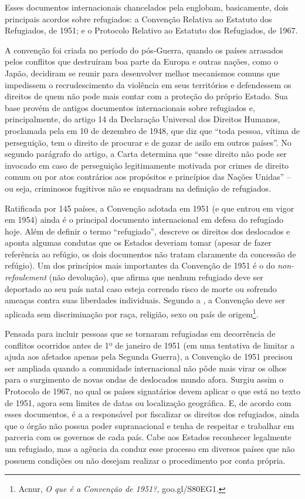 Esses documentos internacionais chancelados pela  englobam,
basicamente, dois principais acordos sobre refugiados: a Convenção
Relativa ao Estatuto dos Refugiados, de 1951; e o Protocolo Relativo ao
Estatuto dos Refugiados, de 1967.

A convenção foi criada no período do pós-Guerra, quando os países
arrasados pelos conflitos que destruíram boa parte da Europa e outras
nações, como o Japão, decidiram se reunir para desenvolver melhor mecanismos
comuns que impedissem o recrudescimento da violência em seus territórios
e defendessem os direitos de quem não pode mais contar com a proteção do
próprio Estado. Sua base provém de antigos documentos internacionais
sobre refugiados e, principalmente, do artigo 14 da Declaração Universal
dos Direitos Humanos, proclamada pela  em 10 de dezembro de 1948, que
diz que ``toda pessoa, vítima de perseguição, tem o direito de procurar
e de gozar de asilo em outros países''. No segundo parágrafo do artigo,
a Carta determina que ``esse direito não pode ser invocado em caso de
perseguição legitimamente motivada por crimes de direito comum ou por
atos contrários aos propósitos e princípios das Nações Unidas'' -- ou
seja, criminosos fugitivos não se enquadram na definição de refugiados.

Ratificada por 145 países, a Convenção adotada em 1951 (e que entrou em
vigor em 1954) ainda é o principal documento internacional em defesa do
refugiado hoje. Além de definir o termo ``refugiado'', descreve os
direitos dos deslocados e aponta algumas condutas que os Estados
deveriam tomar (apesar de fazer referência ao refúgio, os dois
documentos não tratam claramente da concessão de refúgio). Um dos
princípios mais importantes da Convenção de 1951 é o do
\emph{non-refoulement} (não devolução), que afirma que nenhum refugiado
deve ser deportado ao seu país natal caso esteja correndo risco de morte
ou sofrendo ameaças contra suas liberdades individuais. Segundo a ,
a Convenção deve ser aplicada sem discriminação por raça, religião, sexo
ou país de origem\footnote{Acnur, \emph{O que é a
  Convenção de 1951?,}
  goo.gl/S80EG1.}.



Pensada para incluir pessoas que se tornaram refugiadas em decorrência
de conflitos ocorridos antes de 1º de janeiro de 1951 (em uma tentativa
de limitar a ajuda aos afetados apenas pela Segunda Guerra), a Convenção
de 1951 precisou ser ampliada quando a comunidade internacional não pôde
mais virar os olhos para o surgimento de novas ondas de deslocados mundo
afora. Surgiu assim o Protocolo de 1967, no qual os países signatários
devem aplicar o que está no texto de 1951, agora sem limites de datas ou
localização geográfica. E, de acordo com esses documentos, é a  a
responsável por fiscalizar os direitos dos refugiados, ainda que o órgão
não possua poder supranacional e tenha de respeitar e trabalhar em
parceria com os governos de cada país. Cabe aos Estados reconhecer
legalmente um refugiado, mas a agência da  conduz esse processo em
diversos países que não possuem condições ou não desejam realizar o
procedimento por conta própria.

